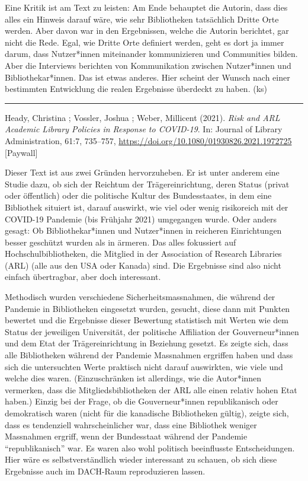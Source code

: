 \documentclass[a4paper,
fontsize=11pt,
oneside,
numbers=noperiodatend,
parskip=half-,
bibliography=totoc,
final
]{scrartcl}
\begin{document}
Eine Kritik ist am Text zu leisten: Am Ende behauptet die Autorin, dass
dies alles ein Hinweis darauf wäre, wie sehr Bibliotheken tatsächlich
Dritte Orte werden. Aber davon war in den Ergebnissen, welche die
Autorin berichtet, gar nicht die Rede. Egal, wie Dritte Orte definiert
werden, geht es dort ja immer darum, dass Nutzer*innen miteinander
kommunizieren und Communities bilden. Aber die Interviews berichten von
Kommunikation zwischen Nutzer*innen und Bibliothekar*innen. Das ist
etwas anderes. Hier scheint der Wunsch nach einer bestimmten Entwicklung
die realen Ergebnisse überdeckt zu haben. (ks)

\begin{center}\rule{0.5\linewidth}{0.5pt}\end{center}

Heady, Christina ; Vossler, Joshua ; Weber, Millicent (2021). \emph{Risk
and ARL Academic Library Policies in Response to COVID-19}. In: Journal
of Library Administration, 61:7, 735--757,
\url{https://doi.org/10.1080/01930826.2021.1972725} {[}Paywall{]}

Dieser Text ist aus zwei Gründen hervorzuheben. Er ist unter anderem
eine Studie dazu, ob sich der Reichtum der Trägereinrichtung, deren
Status (privat oder öffentlich) oder die politische Kultur des
Bundesstaates, in dem eine Bibliothek situiert ist, darauf auswirkt, wie
viel oder wenig risikoreich mit der COVID-19 Pandemie (bis Frühjahr
2021) umgegangen wurde. Oder anders gesagt: Ob Bibliothekar*innen und
Nutzer*innen in reicheren Einrichtungen besser geschützt wurden als in
ärmeren. Das alles fokussiert auf Hochschulbibliotheken, die Mitglied in
der Association of Research Libraries (ARL) (alle aus den USA oder
Kanada) sind. Die Ergebnisse sind also nicht einfach übertragbar, aber
doch interessant.

Methodisch wurden verschiedene Sicherheitsmassnahmen, die während der
Pandemie in Bibliotheken eingesetzt wurden, gesucht, diese dann mit
Punkten bewertet und die Ergebnisse dieser Bewertung statistisch mit
Werten wie dem Status der jeweiligen Universität, der politische
Affiliation der Gouverneur*innen und dem Etat der Trägereinrichtung in
Beziehung gesetzt. Es zeigte sich, dass alle Bibliotheken während der
Pandemie Massnahmen ergriffen haben und dass sich die untersuchten Werte
praktisch nicht darauf auswirkten, wie viele und welche dies waren.
(Einzuschränken ist allerdings, wie die Autor*innen vermerken, dass die
Mitgliedsbibliotheken der ARL alle einen relativ hohen Etat haben.)
Einzig bei der Frage, ob die Gouverneur*innen republikanisch oder
demokratisch waren (nicht für die kanadische Bibliotheken gültig),
zeigte sich, dass es tendenziell wahrscheinlicher war, dass eine
Bibliothek weniger Massnahmen ergriff, wenn der Bundesstaat während der
Pandemie \enquote{republikanisch} war. Es waren also wohl politisch
beeinflusste Entscheidungen. Hier wäre es selbstverständlich wieder
interessant zu schauen, ob sich diese Ergebnisse auch im DACH-Raum
reproduzieren lassen.
\end{document}
